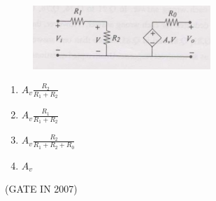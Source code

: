 \documentclass[journal]{IEEEtran}
\begin{document}
\begin{enumerate}
\begin{figure}[H]
    \centering
      \includegraphics[width=0.6\textwidth]{1.jpg} 
      \caption{}
    \label{fig:fig1} 
\end{figure}
\begin{multicols}{2}
\begin{enumerate}
\item $A_v \frac{R_2}{R_1 + R_2}$
\item $A_v \frac{R_1}{R_1 + R_2}$
\item $A_v \frac{R_2}{R_1 + R_2 + R_0}$
\item $A_v$
\end{enumerate}
\end{multicols}
\hfill(GATE IN 2007)


\end{enumerate}
\end{document}
